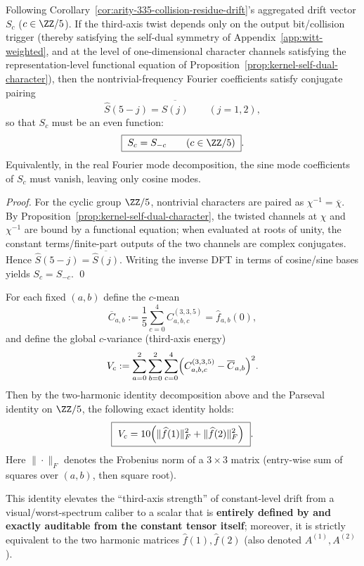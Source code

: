 \begin{corollary}\label{cor:arity-335-cosine-only}
Following Corollary~\ref{cor:arity-335-collision-residue-drift}'s aggregated drift vector \(S_c\) (\(c\in\ZZ/5\)).
If the third-axis twist depends only on the output bit/collision trigger (thereby satisfying the self-dual symmetry of Appendix~\ref{app:witt-weighted}, and at the level of one-dimensional character channels satisfying the representation-level functional equation of Proposition~\ref{prop:kernel-self-dual-character}), then the nontrivial-frequency Fourier coefficients satisfy conjugate pairing
\[
\widehat S(5-j)=\overline{\widehat S(j)}\qquad(j=1,2),
\]
so that \(S_c\) must be an even function:
\[
\boxed{\;
S_c=S_{-c}\qquad(c\in\ZZ/5)\; }.
\]
Equivalently, in the real Fourier mode decomposition, the sine mode coefficients of \(S_c\) must vanish, leaving only cosine modes.
\end{corollary}
\begin{proof}
For the cyclic group \(\ZZ/5\), nontrivial characters are paired as \(\chi^{-1}=\overline{\chi}\).
By Proposition~\ref{prop:kernel-self-dual-character}, the twisted channels at \(\chi\) and \(\chi^{-1}\) are bound by a functional equation; when evaluated at roots of unity, the constant terms/finite-part outputs of the two channels are complex conjugates.
Hence \(\widehat S(5-j)=\overline{\widehat S(j)}\). Writing the inverse DFT in terms of cosine/sine bases yields \(S_c=S_{-c}\). \qed
\end{proof}

\begin{remark}\label{thm:arity-335-c-variance-identity}
For each fixed \((a,b)\) define the \(c\)-mean
\[
\overline C_{a,b}:=\frac{1}{5}\sum_{c=0}^{4}C^{(3,3,5)}_{a,b,c}
=\widehat f_{a,b}(0),
\]
and define the global \(c\)-variance (third-axis energy)
\[
V_c:=\sum_{a=0}^{2}\sum_{b=0}^{2}\sum_{c=0}^{4}\Bigl(C^{(3,3,5)}_{a,b,c}-\overline C_{a,b}\Bigr)^2.
\]
Then by the two-harmonic identity decomposition above and the Parseval identity on \(\ZZ/5\), the following exact identity holds:
\[
\boxed{\
V_c
=10\Bigl(\|\widehat f(1)\|_F^2+\|\widehat f(2)\|_F^2\Bigr)
\ }.
\]
Here \(\|\cdot\|_F\) denotes the Frobenius norm of a \(3\times 3\) matrix (entry-wise sum of squares over \((a,b)\), then square root).
\par
This identity elevates the ``third-axis strength'' of constant-level drift from a visual/worst-spectrum caliber to a scalar that is \textbf{entirely defined by and exactly auditable from the constant tensor itself}; moreover, it is strictly equivalent to the two harmonic matrices \(\widehat f(1),\widehat f(2)\) (also denoted \(A^{(1)},A^{(2)}\)).
\end{remark}

